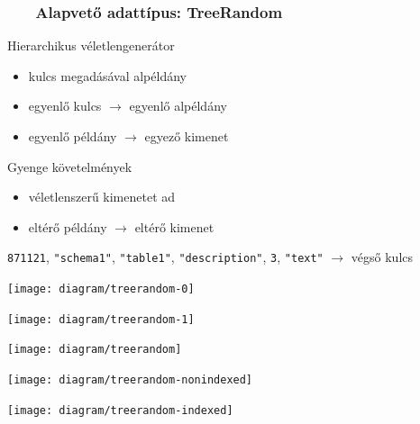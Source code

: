 \documentclass[
    aspectratio=169,
]{beamer}
\newcommand{\slidetitle}[2]{\frametitle{{\small #1 ~ \ding{226} ~ } \normalsize \textbf{#2} }}
\begin{document}
\begin{frame}
    \slidetitle{\sectionshorttitle}{Alapvető adattípus: TreeRandom}
    
    \begin{minipage}[c]{0.5\textwidth}
        \vspace{0.5em}
        
        {\color{beamer@blendedblue}Hierarchikus véletlengenerátor}
        
        \vspace{0.2cm}
        
        \begin{itemize}
            \item kulcs megadásával alpéldány
            \item egyenlő kulcs $\to$ egyenlő alpéldány
            \item egyenlő példány $\to$ egyező kimenet
        \end{itemize}

        \vspace{0.7cm}
        
        {\color{beamer@blendedblue}Gyenge követelmények}

        \vspace{0.2cm}
        
        \begin{itemize}
            \item véletlenszerű kimenetet ad
            \item eltérő példány $\to$ eltérő kimenet
        \end{itemize}

        \begin{overprint}
            \begin{flushright}
                \vspace{2.5em}
                
                { \tiny \color{BrickRed}
                    \texttt{871121}{\color{RoyalPurple},}%
                    \texttt{"schema1"}{\color{RoyalPurple},}%
                    \texttt{"table1"}{\color{RoyalPurple},}%
                    \texttt{"description"}{\color{RoyalPurple},}%
                    \texttt{3}{\color{RoyalPurple},}%
                    \texttt{"text"} {\color{RoyalPurple}$\rightarrow$}
                    végső kulcs
                }
            \end{flushright}
        \end{overprint}
    \end{minipage}%
    \begin{minipage}[c]{0.5\textwidth}
        \begin{overprint}
            \centerline{\texttt{[image: diagram/treerandom-0]}}
            \centerline{\texttt{[image: diagram/treerandom-1]}}
            \centerline{\texttt{[image: diagram/treerandom]}}
            \centerline{\texttt{[image: diagram/treerandom-nonindexed]}}
            \centerline{\texttt{[image: diagram/treerandom-indexed]}}
        \end{overprint}
    \end{minipage}
\end{frame}
\end{document}
